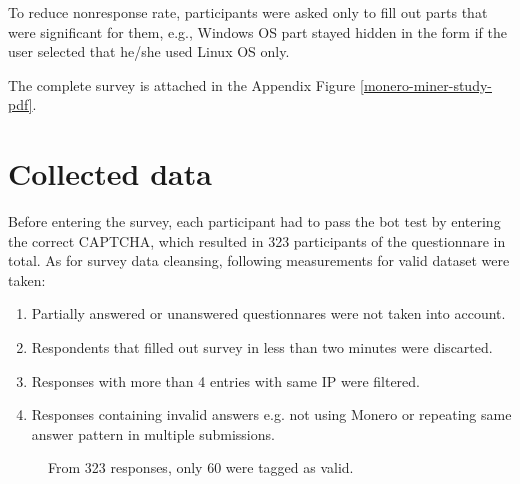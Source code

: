 \documentclass[
  printed, %
  table,   %
  nolof,     %
  nolot,     %
           oneside, color
]{fithesis3}
\begin{document}
To reduce nonresponse rate, participants were asked only to fill out parts that were significant for them, e.g., Windows OS part stayed hidden in the form if the user selected that he/she used Linux OS only. 

The complete survey is attached in the Appendix Figure \ref{monero-miner-study-pdf}.

\section{Collected data}
Before entering the survey, each participant had to pass the bot test by entering the correct CAPTCHA, which resulted in 323 participants of the questionnare in total. As for survey data cleansing, following measurements for valid dataset were taken:
\begin{enumerate}
\itemsep0em
\item Partially answered or unanswered questionnares were not taken into account. 
\item Respondents that filled out survey in less than two minutes were discarted.
\item Responses with more than 4 entries with same IP were filtered.
\item Responses containing invalid answers e.g. not using Monero or repeating same answer pattern in multiple submissions.

\end{enumerate}
\begin{center}
\begin{figure}[H]
\caption{From 323 responses, only 60 were tagged as valid.}
\label{chart:price}\end{figure}\end{center}
\end{document}
